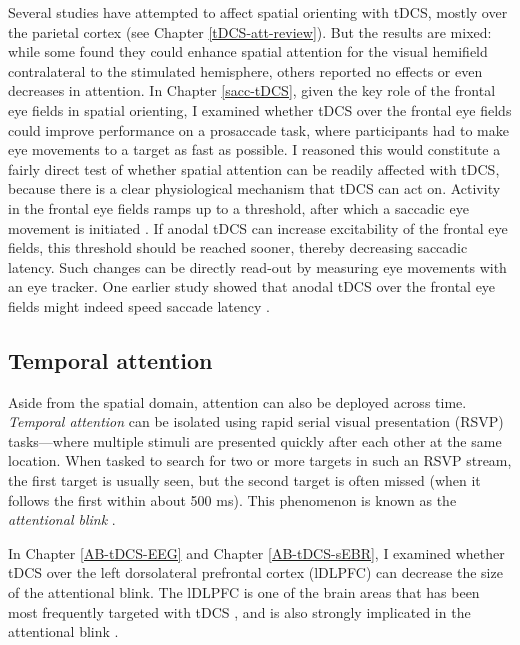 \documentclass[11pt,english,]{memoir}
\begin{document}
Several studies have attempted to affect spatial orienting with tDCS, mostly over the parietal cortex (see Chapter \ref{tDCS-att-review}). But the results are mixed: while some found they could enhance spatial attention for the visual hemifield contralateral to the stimulated hemisphere, others reported no effects or even decreases in attention. In Chapter \ref{sacc-tDCS}, given the key role of the frontal eye fields in spatial orienting, I examined whether tDCS over the frontal eye fields could improve performance on a prosaccade task, where participants had to make eye movements to a target as fast as possible. I reasoned this would constitute a fairly direct test of whether spatial attention can be readily affected with tDCS, because there is a clear physiological mechanism that tDCS can act on. Activity in the frontal eye fields ramps up to a threshold, after which a saccadic eye movement is initiated \autocite{Hanes1996}. If anodal tDCS can increase excitability of the frontal eye fields, this threshold should be reached sooner, thereby decreasing saccadic latency. Such changes can be directly read-out by measuring eye movements with an eye tracker. One earlier study showed that anodal tDCS over the frontal eye fields might indeed speed saccade latency \autocites{Kanai2012}[but see][]{Chen2017}.

\hypertarget{temporal-attention}{%
\subsection{Temporal attention}\label{temporal-attention}}

Aside from the spatial domain, attention can also be deployed across time. \emph{Temporal attention} can be isolated using rapid serial visual presentation (RSVP) tasks---where multiple stimuli are presented quickly after each other at the same location. When tasked to search for two or more targets in such an RSVP stream, the first target is usually seen, but the second target is often missed (when it follows the first within about 500 ms). This phenomenon is known as the \emph{attentional blink} \autocite{Raymond1992}.

In Chapter \ref{AB-tDCS-EEG} and Chapter \ref{AB-tDCS-sEBR}, I examined whether tDCS over the left dorsolateral prefrontal cortex (lDLPFC) can decrease the size of the attentional blink. The lDLPFC is one of the brain areas that has been most frequently targeted with tDCS \autocite{Santarnecchi2015}, and is also strongly implicated in the attentional blink \autocites{Hommel2006}{Slagter2010}.
\end{document}
